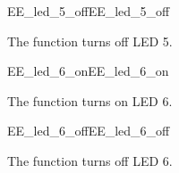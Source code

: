\begin{function_nopb2}{EE\_led\_5\_off}{EE_led_5_off}
  
  \begin{fundescription}
    The function turns off LED 5.
  \end{fundescription}
  
  
  
\end{function_nopb2}

\begin{function_nopb2}{EE\_led\_6\_on}{EE_led_6_on}
  
  \begin{fundescription}
    The function turns on LED 6.
  \end{fundescription}
  
  
  
\end{function_nopb2}

\begin{function_nopb2}{EE\_led\_6\_off}{EE_led_6_off}
  
  \begin{fundescription}
    The function turns off LED 6.
  \end{fundescription}
  
  
  
\end{function_nopb2}

